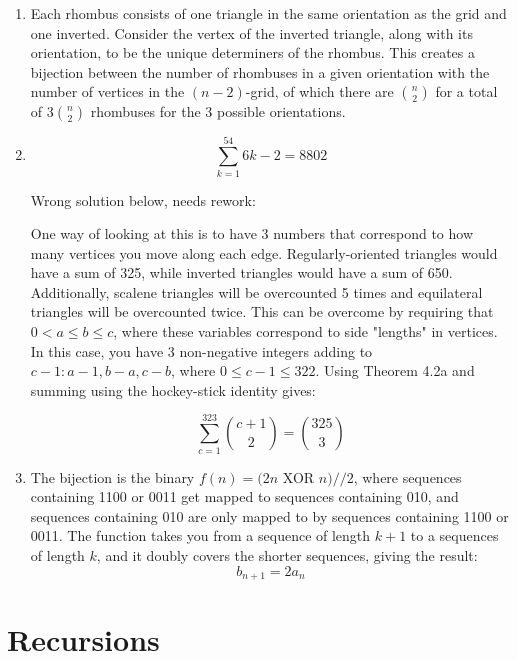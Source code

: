 \documentclass{book}
\numberwithin{equation}{section}
\begin{document}
\begin{enumerate}[label={4.\arabic*}]
\item
Each rhombus consists of one triangle in the same orientation as the grid and one inverted. Consider the vertex
of the inverted triangle, along with its orientation, to be the unique determiners of the rhombus. This creates a
bijection between the number of rhombuses in a given orientation with the number of vertices in the $(n-2)$-grid,
of which there are ${n \choose 2}$ for a total of $3{n \choose 2}$ rhombuses for the 3 possible orientations.

\item
$$\sum_{k=1}^54 6k - 2 = 8802$$

Wrong solution below, needs rework:

One way of looking at this is to have 3 numbers that correspond to how many vertices you move along each edge.
Regularly-oriented triangles would have a sum of 325, while inverted triangles would have a sum of 650. Additionally,
scalene triangles will be overcounted 5 times and equilateral triangles will be overcounted twice. This can be overcome
by requiring that $0 < a \leq b \leq c$, where these variables correspond to side "lengths" in vertices. 
In this case, you have 3 non-negative integers adding to $c-1: a-1, b-a, c-b$, where $0 \leq c-1 \leq 322$. Using Theorem 4.2a and
summing using the hockey-stick identity gives:

$$\sum_{c=1}^323 {c+1 \choose 2} = {325 \choose 3}$$

\item
The bijection is the binary $f(n) = (2n$ XOR $n) // 2$, where sequences containing 1100 or 0011 get mapped to sequences
containing 010, and sequences containing 010 are only mapped to by sequences containing 1100 or 0011. The
function takes you from a sequence of length $k + 1$ to a sequences of length $k$, and it doubly covers
the shorter sequences, giving the result:
$$b_{n+1} = 2a_n$$

\end{enumerate}

\chapter{Recursions}
\end{document}

